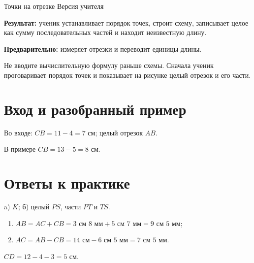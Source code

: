 \worksheettitle
  {Точки на отрезке}
  { Версия учителя}

\begin{teacherbox}
  \textbf{Результат:} ученик устанавливает порядок точек, строит схему,
  записывает целое как сумму последовательных частей и находит неизвестную
  длину.

  \textbf{Предварительно:} измеряет отрезки и переводит единицы длины.
\end{teacherbox}

\begin{teacherbox}
  Не вводите вычислительную формулу раньше схемы. Сначала ученик проговаривает
  порядок точек и показывает на рисунке целый отрезок и его части.
\end{teacherbox}

\section{Вход и разобранный пример}

Во входе: $CB=11-4=7$ см; целый отрезок $AB$.

\betweenfigure

В примере $CB=13-5=8$ см.

\section{Ответы к практике}

\begin{practicebox}[1. Порядок]
  a) $K$; б) целый $PS$, части $PT$ и $TS$.
\end{practicebox}

\begin{practicebox}
  \begin{enumerate}[label=\alph*)]
    \item $AB=AC+CB=3\text{ см }8\text{ мм}+5\text{ см }7\text{ мм}
      =9\text{ см }5\text{ мм}$;
    \item $AC=AB-CB=14\text{ см}-6\text{ см }5\text{ мм}
      =7\text{ см }5\text{ мм}$.
  \end{enumerate}
\end{practicebox}

\fourpointsfigure

\begin{practicebox}
  $CD=12-4-3=5$ см.
\end{practicebox}

